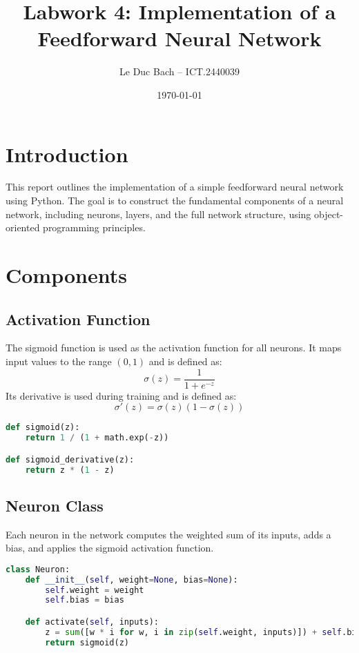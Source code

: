 \documentclass[a4paper, 12pt]{article}
\title{Labwork 4: Implementation of a Feedforward Neural Network}
\author{Le Duc Bach -- ICT.2440039}
\date{\today}
\begin{document}
\maketitle

\section{Introduction}
This report outlines the implementation of a simple feedforward neural network using Python. The goal is to construct the fundamental components of a neural network, including neurons, layers, and the full network structure, using object-oriented programming principles.

\section{Components}

\subsection{Activation Function}
The sigmoid function is used as the activation function for all neurons. It maps input values to the range $(0, 1)$ and is defined as:
\[
\sigma(z) = \frac{1}{1 + e^{-z}}
\]
Its derivative is used during training and is defined as:
\[
\sigma'(z) = \sigma(z) (1 - \sigma(z))
\]

\begin{lstlisting}[language=Python, caption=Sigmoid Functions]
def sigmoid(z):
    return 1 / (1 + math.exp(-z))

def sigmoid_derivative(z):
    return z * (1 - z)
\end{lstlisting}

\subsection{Neuron Class}
Each neuron in the network computes the weighted sum of its inputs, adds a bias, and applies the sigmoid activation function.

\begin{lstlisting}[language=Python, caption=Neuron Definition]
class Neuron:
    def __init__(self, weight=None, bias=None):
        self.weight = weight
        self.bias = bias

    def activate(self, inputs):
        z = sum([w * i for w, i in zip(self.weight, inputs)]) + self.bias
        return sigmoid(z)
\end{lstlisting}
\end{document}
